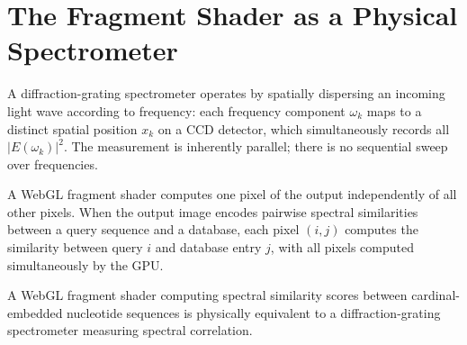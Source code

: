 \section{The Fragment Shader as a Physical Spectrometer}
\label{sec:shader_spectrometer}

A diffraction-grating spectrometer operates by spatially dispersing an
incoming light wave according to frequency: each frequency component $\omega_k$
maps to a distinct spatial position $x_k$ on a CCD detector, which simultaneously
records all $|E(\omega_k)|^2$. The measurement is inherently parallel; there
is no sequential sweep over frequencies.

A WebGL fragment shader computes one pixel of the output independently of all
other pixels. When the output image encodes pairwise spectral similarities
between a query sequence and a database, each pixel $(i,j)$ computes the
similarity between query $i$ and database entry $j$, with all pixels computed
simultaneously by the GPU.

\begin{theorem}[Shader = Physical Spectrometer]
\label{thm:shader_spectrometer}
A WebGL fragment shader computing spectral similarity scores between
cardinal-embedded nucleotide sequences is physically equivalent to a
diffraction-grating spectrometer measuring spectral correlation.
\end{theorem}

